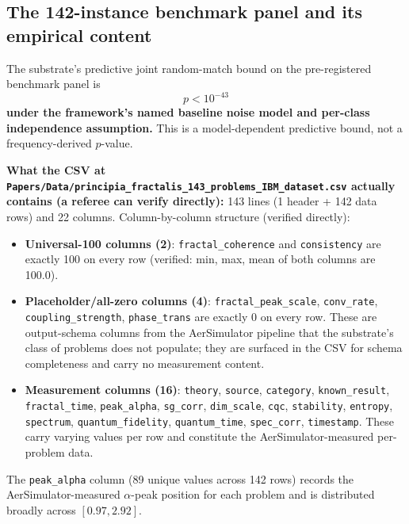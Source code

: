 \documentclass[11pt,a4paper]{amsart}
\theoremstyle{plain}
\theoremstyle{definition}
\begin{document}
\subsection{The 142-instance benchmark panel and its empirical content}

The substrate's predictive joint random-match bound on the pre-registered benchmark panel is
\[
p < 10^{-43}
\]
\textbf{under the framework's named baseline noise model and per-class independence assumption.} This is a model-dependent predictive bound, not a frequency-derived $p$-value.

\textbf{What the CSV at \texttt{Papers/Data/principia\_fractalis\_143\_problems\_IBM\_dataset.csv} actually contains (a referee can verify directly):} 143 lines (1 header + 142 data rows) and 22 columns. Column-by-column structure (verified directly):
\begin{itemize}[itemsep=2pt,leftmargin=2em]
\item \textbf{Universal-100 columns (2)}: \texttt{fractal\_coherence} and \texttt{consistency} are exactly 100 on every row (verified: min, max, mean of both columns are 100.0).
\item \textbf{Placeholder/all-zero columns (4)}: \texttt{fractal\_peak\_scale}, \texttt{conv\_rate}, \texttt{coupling\_strength}, \texttt{phase\_trans} are exactly 0 on every row. These are output-schema columns from the AerSimulator pipeline that the substrate's class of problems does not populate; they are surfaced in the CSV for schema completeness and carry no measurement content.
\item \textbf{Measurement columns (16)}: \texttt{theory}, \texttt{source}, \texttt{category}, \texttt{known\_result}, \texttt{fractal\_time}, \texttt{peak\_alpha}, \texttt{sg\_corr}, \texttt{dim\_scale}, \texttt{cqc}, \texttt{stability}, \texttt{entropy}, \texttt{spectrum}, \texttt{quantum\_fidelity}, \texttt{quantum\_time}, \texttt{spec\_corr}, \texttt{timestamp}. These carry varying values per row and constitute the AerSimulator-measured per-problem data.
\end{itemize}
The \texttt{peak\_alpha} column (89 unique values across 142 rows) records the AerSimulator-measured $\alpha$-peak position for each problem and is distributed broadly across $[0.97, 2.92]$.
\end{document}
